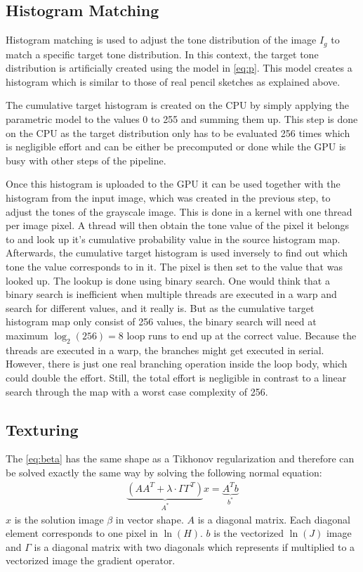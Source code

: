 \subsection{Histogram Matching}
Histogram matching is used to adjust the tone distribution of the 
image $I_g$ to match a specific target tone distribution. In this context, the
target tone distribution is artificially created using the model in
\autoref{eq:p}. This model creates a histogram which is similar to those of real
pencil sketches as explained above.

The cumulative target histogram is created on the CPU by simply applying
the parametric model to the values 0 to 255 and summing them up. This step is done
on the CPU as the target distribution only has to be evaluated 256 times which
is negligible effort and can be either be precomputed or done while the GPU is
busy with other steps of the pipeline.

Once this histogram is uploaded to the GPU it can be used together with
the histogram from the input image, which was created in the previous step, to
adjust the tones of the grayscale image. This is done in a kernel with one
thread per image pixel. A thread will then obtain the tone value of the pixel it
belongs to and look up it's cumulative probability value in the source histogram
map.  Afterwards, the cumulative target histogram is used inversely to find out
which tone the value corresponds to in it. The pixel is then set to the value
that was looked up. The lookup is done using binary search.
One would think that a binary search is inefficient when multiple threads
are executed in a warp and search for different values, and it really is.
But as the cumulative target histogram map only consist of 256 values,
the binary search will need at maximum $\log_2(256)=8$ loop runs to end
up at the correct value. Because the threads are executed in a warp,
the branches might get executed in serial. However, there is just one 
real branching operation inside the loop body, which could double the
effort. Still, the total effort is negligible in contrast to a linear search
through the map with a worst case complexity of 256.

\subsection{Texturing}
The \autoref{eq:beta} has the same shape as a Tikhonov regularization and
therefore can be solved exactly the same way by solving the following normal
equation:
\begin{align}
  \underbrace{(A A^T + \lambda \cdot \Gamma \Gamma^T)}_{A^*} x = \underbrace{A^T
  b}_{b^*}
  \label{eq:tikhonov}
\end{align}
$x$ is the solution image $\beta$ in vector shape. $A$ is a diagonal matrix.
Each diagonal element corresponds to one pixel in $\ln(H)$. $b$ is the
vectorized $\ln(J)$ image and $\Gamma$ is a diagonal matrix with two diagonals
which represents if multiplied to a vectorized image the gradient operator.

